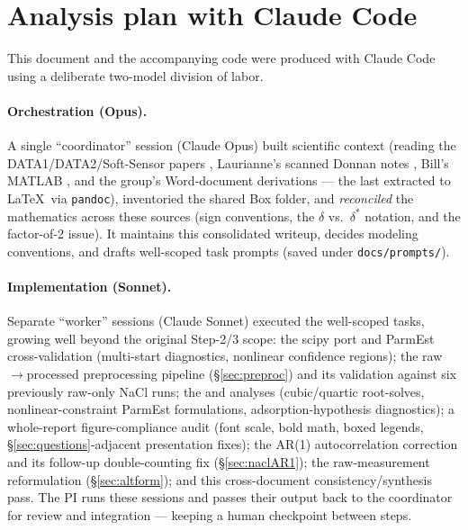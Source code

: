 \documentclass[11pt]{article}
\newcommand{\dstar}{\delta^{*}}
\begin{document}
\section{Analysis plan with Claude Code}\label{sec:claude}
This document and the accompanying code were produced with Claude Code using a
deliberate two-model division of labor.

\paragraph{Orchestration (Opus).} A single ``coordinator'' session (Claude Opus)
built scientific context (reading the DATA1/DATA2/Soft-Sensor papers
\cite{ouimet2022data1,liu2025data2,lilonfe2025softsensors}, Laurianne's
scanned Donnan notes \cite{donnan11notes,donnan21notes,donnan31notes}, Bill's
MATLAB \cite{billmatlab}, and the group's Word-document derivations
\cite{siDocx,donnanThermoDoc,transportDoc,boeDoc,manuscriptOutline,processModelDraft,multicompDonnanTheory}
--- the last extracted to \LaTeX\ via \texttt{pandoc}), inventoried the shared Box
folder, and \emph{reconciled} the mathematics across these sources (sign
conventions, the $\delta$ vs.\ $\dstar$ notation, and the factor-of-2 issue). It
maintains this consolidated writeup, decides modeling conventions, and drafts
well-scoped task prompts (saved under \texttt{docs/prompts/}).

\paragraph{Implementation (Sonnet).} Separate ``worker'' sessions (Claude Sonnet)
executed the well-scoped tasks, growing well beyond the original Step-2/3 scope:
the scipy port and ParmEst cross-validation (multi-start diagnostics, nonlinear
confidence regions); the raw$\to$processed preprocessing pipeline
(\S\ref{sec:preproc}) and its validation against six previously raw-only NaCl
runs; the  and  analyses (cubic/quartic root-solves,
nonlinear-constraint ParmEst formulations, adsorption-hypothesis diagnostics);
a whole-report figure-compliance audit (font scale, bold math, boxed legends,
\S\ref{sec:questions}-adjacent presentation fixes); the AR(1) autocorrelation
correction and its follow-up double-counting fix (\S\ref{sec:naclAR1}); the
raw-measurement reformulation (\S\ref{sec:altform}); and this cross-document
consistency/synthesis pass. The PI runs these sessions and passes their output
back to the coordinator for review and integration --- keeping a human
checkpoint between steps.
\end{document}
